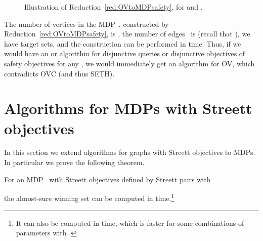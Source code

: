 \documentclass[11pt,letterpaper]{article}
\newif\iffullversion
\newcommand{\infull}[1]{\iffullversion #1\fi}
\newcommand{\inshort}[1]{\iffullversion \else #1\fi}
\begin{document}
  \begin{figure}
  \centering
   \infull{
      \caption{Illustration of Reduction~\ref{red:OVtoMDPsafety}, for  and 
    .}
   }
   \inshort{
      \caption{Illustration of Reduction~\ref{red:OVtoMDPsafety}, for   and 
     .}
   }
  \label{fig:OVtoMDPsafety}
  \end{figure}

The number of vertices in the MDP~, constructed by Reduction~\ref{red:OVtoMDPsafety}, is , the number of edges~ is  
(recall that ), we have  target sets, and the construction can be performed in 
 time.
Thus, if we would have an  or 
algorithm for disjunctive 
queries or disjunctive objectives of safety objectives for any , we
would immediately get an   algorithm for OV, which contradicts OVC (and thus SETH).

\section{Algorithms for MDPs with Streett objectives}\label{sec:streett}

In this section we extend algorithms for graphs with Streett objectives to MDPs. 
In particular we prove the following theorem.
\begin{theorem}
	For an MDP~ with Streett objectives defined by Streett pairs 
	 with 
	
	the almost-sure winning set can be computed in  time.\footnote{It can also be computed in 
	 time, which is faster for some combinations
	of parameters with .}
\end{theorem}
\end{document}
